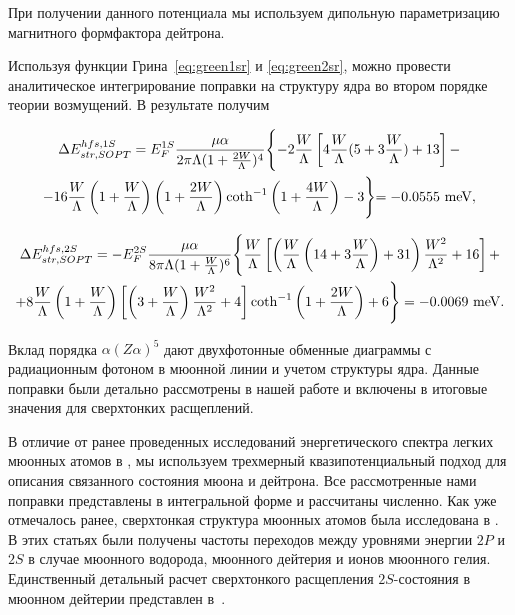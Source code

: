 При получении данного потенциала мы используем дипольную параметризацию магнитного формфактора дейтрона.

Используя функции Грина~\eqref{eq:green1sr} и \eqref{eq:green2sr}, можно провести аналитическое интегрирование поправки на структуру ядра во втором порядке теории возмущений. В результате получим

\begin{multline}

\label{eq:1s_SOPT}

\Delta E^{hfs, 1S}_{str,SOPT}=E_F^{1S}\frac{\mu\alpha}{2\pi\Lambda(1+\frac{2W}{\Lambda})^4}

\Biggl\{-2\frac{W}{\Lambda}\left[4\frac{W}{\Lambda}(5+3\frac{W}{\Lambda})+13\right]-

\\

-16\frac{W}{\Lambda}\left(1+\frac{W}{\Lambda}\right)\left(1+\frac{2W}{\Lambda}\right)\coth^{-1}\left(1+\frac{4W}{\Lambda}\right)-3\Biggl\}

=-0.0555~\rm meV,

\end{multline}

\begin{multline}

\label{eq:2s_SOPT}

\Delta E^{hfs,2S}_{str,SOPT}=-E_F^{2S}\frac{\mu\alpha}{8\pi\Lambda(1+\frac{W}{\Lambda})^6}

\Biggl\{\frac{W}{\Lambda}\left[\left(\frac{W}{\Lambda}\left(14+3\frac{W}{\Lambda}\right)+31\right)\frac{W^2}{\Lambda^2}+16\right]+

\\

+8\frac{W}{\Lambda}\left(1+\frac{W}{\Lambda}\right)\left[\left(3+\frac{W}{\Lambda}\right)\frac{W^2}{\Lambda^2}+4\right]\coth^{-1}\left(1+\frac{2W}{\Lambda}\right)+

6\Biggr\}=-0.0069~\rm meV.

\end{multline}



Вклад порядка $\alpha(Z\alpha)^5$ дают двухфотонные обменные диаграммы с радиационным фотоном в мюонной линии и учетом структуры ядра. Данные поправки были детально рассмотрены в нашей работе \cite{m5} и включены в итоговые значения для сверхтонких расщеплений.



В отличие от ранее проведенных исследований энергетического спектра легких мюонных атомов в \cite{borie1}, мы используем трехмерный квазипотенциальный подход для описания связанного состояния мюона и дейтрона. Все рассмотренные нами поправки представлены в интегральной форме и рассчитаны численно. Как уже отмечалось ранее, сверхтонкая структура мюонных атомов была исследована в \cite{borie1,kp1996}. В этих статьях были получены частоты переходов между уровнями энергии $2P$ и $2S$ в случае мюонного водорода, мюонного дейтерия и ионов мюонного гелия. Единственный детальный расчет сверхтонкого расщепления $2S$-состояния в мюонном дейтерии представлен в~\cite{borie1}.

